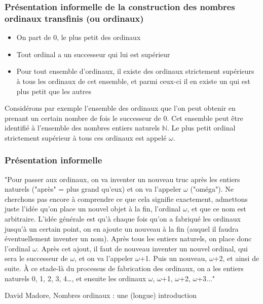 \documentclass[12pt]{beamer}
\begin{document}
\begin{frame}
\frametitle{Présentation informelle de la construction des nombres ordinaux transfinis (ou ordinaux)}

\begin{itemize}
     \setlength{\itemsep}{1pt}
     \setlength{\parskip}{0pt}
     \setlength{\parsep}{0pt}
\item On part de 0, le plus petit des ordinaux
\item Tout ordinal a un successeur qui lui est supérieur
\item Pour tout ensemble d'ordinaux, il existe des ordinaux strictement supérieurs à tous les ordinaux de cet ensemble, et parmi ceux-ci il en existe un qui est plus petit que les autres
\end{itemize}
 
Considérons par exemple l'ensemble des ordinaux que l'on peut obtenir en prenant un certain nombre de fois le successeur de 0. Cet ensemble peut être identifié à l'ensemble des nombres entiers naturels $\mathbb{N}$. Le plus petit ordinal strictement supérieur à tous ces ordinaux est appelé $\omega$.


\end{frame}
\begin{frame}
\frametitle{Présentation informelle}

\small

"Pour passer aux ordinaux, on va inventer un nouveau truc après les entiers naturels ("après" = plus grand qu'eux) et on va l'appeler $\omega$ ("oméga"). Ne cherchons pas encore à comprendre ce que cela signifie exactement, admettons juste l'idée qu'on place un nouvel objet à la fin, l'ordinal $\omega$, et que ce nom est arbitraire. L'idée générale est qu'à chaque fois qu'on a fabriqué les ordinaux jusqu'à un certain point, on en ajoute un nouveau à la fin (auquel il faudra éventuellement inventer un nom). Après tous les entiers naturels, on place donc l'ordinal $\omega$. Après cet ajout, il faut de nouveau inventer un nouvel ordinal, qui sera le successeur de $\omega$, et on va l'appeler $\omega$+1. Puis un nouveau, $\omega$+2, et ainsi de suite. À ce stade-là du processus de fabrication des ordinaux, on a les entiers naturels 0, 1, 2, 3, 4…, et ensuite les ordinaux $\omega$, $\omega$+1, $\omega$+2, $\omega$+3..."

David Madore, Nombres ordinaux : une (longue) introduction

\end{frame}
\end{document}
